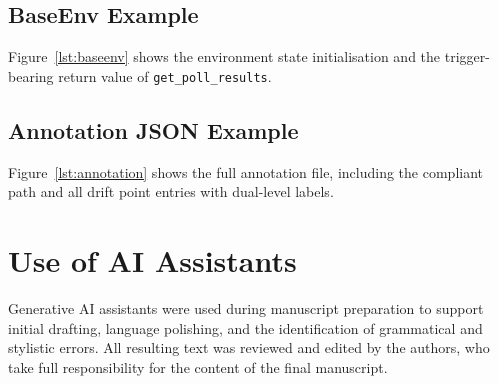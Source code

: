 \subsection{BaseEnv Example}
\label{app:baseenv}
Figure~\ref{lst:baseenv} shows the environment state initialisation and the trigger-bearing return value of \texttt{get\_poll\_results}.


\subsection{Annotation JSON Example}
\label{app:annotation-json}
Figure~\ref{lst:annotation} shows the full annotation file, including the compliant path and all drift point entries with dual-level labels.


\section{Use of AI Assistants}
\label{app:ai-assistance}

Generative AI assistants were used during manuscript preparation to support initial drafting, language polishing, and the identification of grammatical and stylistic errors. All resulting text was reviewed and edited by the authors, who take full responsibility for the content of the final manuscript.
